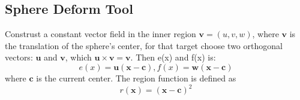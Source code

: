 \documentclass{article}
\theoremstyle{definition}
\theoremstyle{remark}
\begin{document}
\subsection{Sphere Deform Tool}
Construst a constant vector field in the inner region $\textbf{v}=(u, v, w)$, where $\textbf{v}$ is the translation of the sphere's center, for that target choose two orthogonal vectors: $\textbf{u}$ and $\textbf{v}$, which $\textbf{u} \times \textbf{v} = \textbf{v}$. Then e(x) and f(x) is:
\begin{equation}
  e(x)=\textbf{u}(\textbf{x}-\textbf{c}), f(x)=\textbf{w}(\textbf{x}-\textbf{c})
\end{equation}
where $\textbf{c}$ is the current center. The region function is defined as
\begin{equation}
  r(\textbf{x}) = (\textbf{x}-\textbf{c})^2
\end{equation}







\end{document}
